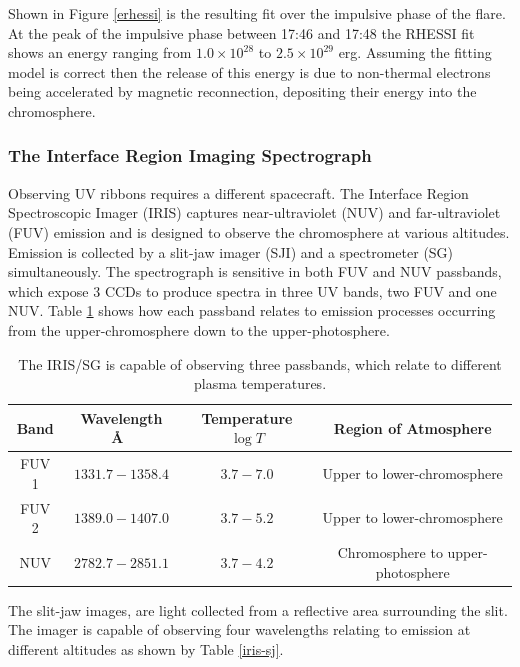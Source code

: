 \documentclass[11pt]{article}
\begin{document}
Shown in Figure \ref{erhessi} is the resulting fit over the impulsive phase of the flare. At the peak of the impulsive phase between 17:46 and 17:48 the RHESSI fit shows an energy ranging from $1.0{\times}10^{28}$ to $2.5{\times}10^{29}$ erg. Assuming the fitting model is correct then the release of this energy is due to non-thermal electrons being accelerated by magnetic reconnection, depositing their energy into the chromosphere. 



\subsubsection{The Interface Region Imaging Spectrograph}
Observing UV ribbons requires a different spacecraft. The Interface Region Spectroscopic Imager (IRIS) captures near-ultraviolet (NUV) and far-ultraviolet (FUV) emission and is designed to observe the chromosphere at various altitudes. Emission is collected by a slit-jaw imager (SJI) and a spectrometer (SG) simultaneously. The spectrograph is sensitive in both FUV and NUV passbands, which expose 3 CCDs to produce spectra in three UV bands, two FUV and one NUV. Table \ref{iris-sg} shows how each passband relates to emission processes occurring from the upper-chromosphere down to the upper-photosphere.

\begin{table}[H]
\centering
\begin{tabular}{|c|c|c|c|}
Band & Wavelength \AA\ & Temperature $\log{T}$ & Region of Atmosphere\\
\hline
FUV 1 & $1331.7 - 1358.4$ & $3.7 - 7.0$ & Upper to lower-chromosphere\\
FUV 2 & $1389.0 - 1407.0$ & $3.7 - 5.2$ & Upper to lower-chromosphere\\
NUV & $2782.7 - 2851.1$ & $3.7 - 4.2$ & Chromosphere to upper-photosphere\\
\end{tabular}
\caption{The IRIS/SG is capable of observing three passbands, which relate to different plasma temperatures.}\label{iris-sg}
\end{table}


The slit-jaw images, are light collected from a reflective area surrounding the slit. The imager is capable of observing four wavelengths relating to emission at different altitudes as shown by Table \ref{iris-sj}.
\end{document}
